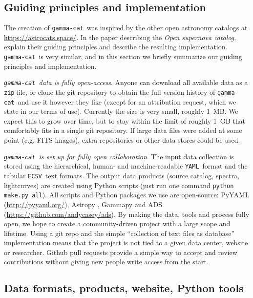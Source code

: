 \documentclass[11pt,twoside]{article}
\newcommand{\gammacat}{\texttt{gamma-cat}}
\newcommand{\yaml}{\texttt{YAML}}
\newcommand{\ecsv}{\texttt{ECSV}}
\newcommand{\astrocats}{\url{https://astrocats.space/}}
\newcommand{\pyads}{\url{https://github.com/andycasey/ads}}
\begin{document}
\subsection{Guiding principles and implementation}

The creation of \gammacat\ was inspired by the other open astronomy catalogs at
\astrocats. In the paper describing the \emph{Open supernova catalog},
\citet{sne-cat} explain their guiding principles and describe the resulting
implementation. \gammacat\ is very similar, and in this section we briefly
summarize our guiding principles and implementation.

\emph{\gammacat\ data is fully open-access}. Anyone can download all available
data as a \texttt{zip} file, or clone the git repository to obtain the full
version history of \gammacat\ and use it however they like (except for an
attribution request, which we state in our terms of use). Currently the size is
very small, roughly 1~MB. We expect this to grow over time, but to stay within
the limit of roughly 1~GB that comfortably fits in a single git repository. If
large data files were added at some point (e.g. FITS images), extra repositories
or other data stores could be used.

\emph{\gammacat\ is set up for fully open collaboration}. The input data
collection is stored using the hierarchical, human- and machine-readable \yaml\
format and the tabular \ecsv\ text formats. The output data products (source
catalog, spectra, lightcurves) are created using Python scripts (just run one
command \texttt{python make.py all}). All scripts and Python packages we use are
open-source: PyYAML (\url{http://pyyaml.org/}), Astropy \citep{astropy}, Gammapy
\citep{gammapy} and ADS (\pyads). By making the data, tools and process fully
open, we hope to create a community-driven project with a large scope and
lifetime. Using a git repo and the simple ``collection of text files as
database'' implementation means that the project is not tied to a given data
center, website or researcher. Github pull requests provide a simple way to
accept and review contributions without giving new people write access from the
start.

\subsection{Data formats, products, website, Python tools}
\end{document}

